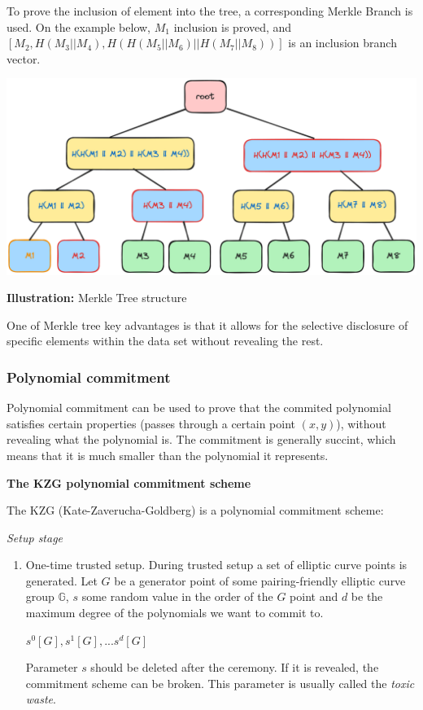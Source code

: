 \documentclass[../lecture-notes.tex]{subfiles}
\begin{document}
To prove the inclusion of element into the tree, a corresponding Merkle Branch is used. On the example below, $M_1$ inclusion is proved, and 
$[M_2, H(M_3 || M_4), H(H(M_5 || M_6) || H(M_7 || M_8))]$ is an inclusion branch vector.

\begin{center}
    \centering\includegraphics[width=0.9\linewidth, clip]{images/lecture_5/MerkleTreeProof.png}

    \scriptsize{\textbf{Illustration:} Merkle Tree structure}
\end{center}

One of Merkle tree key advantages is that it allows for the selective disclosure of specific elements within the data set without revealing the rest. 

\subsubsection{Polynomial commitment}

Polynomial commitment can be used to prove that the commited polynomial satisfies certain properties (passes through a certain point $(x,y)$), without revealing what the polynomial is.
The commitment is generally succint, which means that it is much smaller than the polynomial it represents.

\vspace{0.5 cm}

\textbf{The KZG polynomial commitment scheme}

\vspace{0.5 cm}


The KZG (Kate-Zaverucha-Goldberg) is a polynomial commitment scheme:

\textit{Setup stage}

\begin{enumerate}
    \item One-time trusted setup. During trusted setup a set of elliptic curve points is generated. Let $G$ be a generator point of some pairing-friendly
    elliptic curve group $\mathbb{G}$, $s$ some random value in the order of the $G$ point and $d$ be the maximum degree of the polynomials we want to commit to.

    \begin{center}
        $s^0[G], s^1[G], ... s^d[G]$
    \end{center}

    Parameter $s$ should be deleted after the ceremony. If it is revealed, the commitment scheme can be broken. This parameter is usually called the \textit{toxic waste}.

\end{enumerate}
\end{document}
